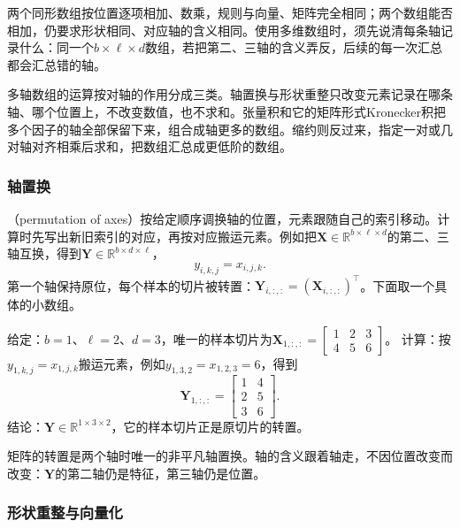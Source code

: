 两个同形数组按位置逐项相加、数乘，规则与向量、矩阵完全相同；两个数组能否相加，仍要求形状相同、对应轴的含义相同。使用多维数组时，须先说清每条轴记录什么：同一个$b\times\ell\times d$数组，若把第二、三轴的含义弄反，后续的每一次汇总都会汇总错的轴。


\label{sec:ls-tensor-operations}

多轴数组的运算按对轴的作用分成三类。轴置换与形状重整只改变元素记录在哪条轴、哪个位置上，不改变数值，也不求和。张量积和它的矩阵形式Kronecker积把多个因子的轴全部保留下来，组合成轴更多的数组。缩约则反过来，指定一对或几对轴对齐相乘后求和，把数组汇总成更低阶的数组。

\subsubsection{轴置换}
\label{sec:ls-tensor-reshaping}
\label{sec:linear-algebra-tensors-structured-operations}

（permutation of axes）按给定顺序调换轴的位置，元素跟随自己的索引移动。计算时先写出新旧索引的对应，再按对应搬运元素。例如把$\bm X\in\mathbb R^{b\times\ell\times d}$的第二、三轴互换，得到$\bm Y\in\mathbb R^{b\times d\times\ell}$，
\[
 y_{i,k,j}=x_{i,j,k}.
\]
第一个轴保持原位，每个样本的切片被转置：$\bm Y_{i,:,:}=(\bm X_{i,:,:})^\top$。下面取一个具体的小数组。
\begin{example}[交换后两条轴]
\label{ex:ls-axis-swap}
给定：$b=1$、$\ell=2$、$d=3$，唯一的样本切片为$\bm X_{1,:,:}=\left[\begin{smallmatrix}1&2&3\\4&5&6\end{smallmatrix}\right]$。
计算：按$y_{1,k,j}=x_{1,j,k}$搬运元素，例如$y_{1,3,2}=x_{1,2,3}=6$，得到
\[
 \bm Y_{1,:,:}=\begin{bmatrix}1&4\\2&5\\3&6\end{bmatrix}.
\]
结论：$\bm Y\in\mathbb R^{1\times3\times2}$，它的样本切片正是原切片的转置。
\end{example}
矩阵的转置是两个轴时唯一的非平凡轴置换。轴的含义跟着轴走，不因位置改变而改变：$\bm Y$的第二轴仍是特征，第三轴仍是位置。

\subsubsection{形状重整与向量化}

